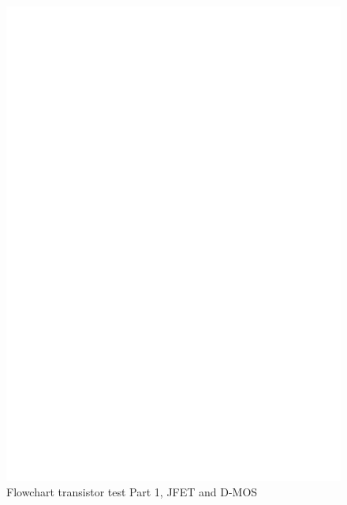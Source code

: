 \begin{figure}[H]
\centering
\includegraphics[]{../FIG/CheckSemi1.eps}
\caption{Flowchart transistor test Part 1, JFET and D-MOS}
\label{fig:ChkSemi1}
\end{figure}

